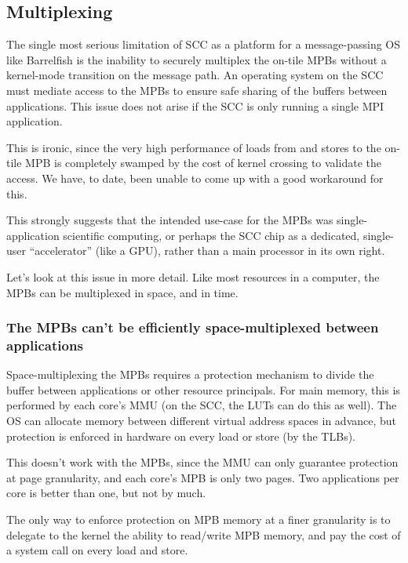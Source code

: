 \documentclass[a4paper,twoside]{report} %
\begin{document}
\subsection{Multiplexing}\label{sec:mpbmux}

The single most serious limitation of SCC as a platform for a
message-passing OS like Barrelfish is the inability to securely
multiplex the on-tile MPBs without a kernel-mode transition on the
message path.    An operating system on the SCC must mediate access to
the MPBs to ensure safe sharing of the buffers between applications. 
This issue does not arise if the SCC is only running a single MPI
application. 

This is ironic, since the very high performance of loads from and
stores to the on-tile MPB is completely swamped by the cost of kernel
crossing to validate the access.  We have, to date, been unable to
come up with a good workaround for this. 

This strongly suggests that the intended use-case for the MPBs was
single-application scientific computing, or perhaps the SCC chip as a
dedicated, single-user ``accelerator'' (like a GPU), rather than a
main processor in its own right.  

Let's look at this issue in more detail. Like most resources in a
computer, the MPBs can be multiplexed in space, and in time. 

\subsubsection{The MPBs can't be efficiently space-multiplexed between
  applications} 

Space-multiplexing the MPBs requires a protection mechanism to divide
the buffer between applications or other resource principals.  For
main memory, this is performed by each core's MMU (on the SCC, the
LUTs can do this as well).  The OS can allocate memory
between different virtual address spaces in advance, but protection is
enforced in hardware on every load or store (by the TLBs).  

This doesn't work with the MPBs, since the MMU can only guarantee
protection at page granularity, and each core's MPB is only two
pages.  Two applications per core is better than one, but not by
much. 

The only way to enforce protection on MPB memory at a finer
granularity is to delegate to the kernel the ability to read/write MPB
memory, and pay the cost of a system call on every load and store. 
\end{document}
